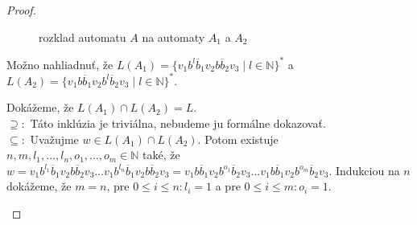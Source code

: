 \begin{proof}
\begin{enumerate}
\begin{figure}[H]
\caption{rozklad automatu $ A $ na automaty $ A_1 $ a $ A_2 $}
\end{figure}

Možno nahliadnuť, že $ L(A_1) = \lbrace v_1b^{l}\overline{b}_1v_2b\overline{b}_2v_3 \; | \; l \in \mathbb{N} \rbrace^* $ a $ L(A_2) = \lbrace v_1b\overline{b}_1v_2b^{l}\overline{b}_2v_3 \; | \; l \in \mathbb{N} \rbrace^* $.
\par 
Dokážeme, že $ L(A_1) \cap L(A_2) = L$. \\
$ \supseteq: $ Táto inklúzia je triviálna, nebudeme ju formálne dokazovať. \\
$ \subseteq: $ Uvažujme $ w \in L(A_1) \cap L(A_2) $. Potom existuje $ n,m,l_1,\ldots,l_n,o_1,\ldots,o_m \in \mathbb{N} $ také, že $ w = v_1b^{l_1}\overline{b}_1v_2b\overline{b}_2v_3 \ldots v_1b^{l_n}\overline{b}_1v_2b\overline{b}_2v_3 = v_1b\overline{b}_1v_2b^{o_1}\overline{b}_2v_3 \ldots v_1b\overline{b}_1v_2b^{o_m}\overline{b}_2v_3 $. Indukciou na $ n $ dokážeme, že $ m=n $, pre $ 0 \leq i \leq n: l_i=1 $ a pre $ 0 \leq i \leq m: o_i=1 $.


\end{enumerate}
\end{proof}
